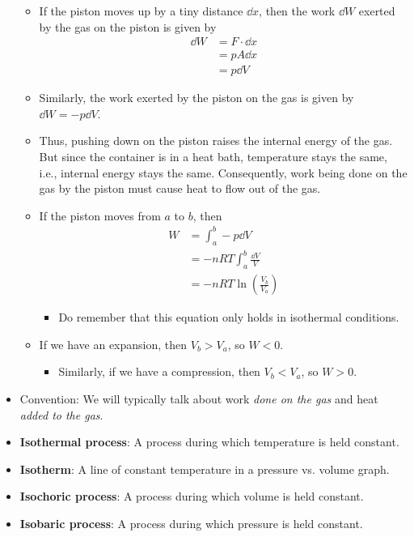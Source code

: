 \documentclass[../notes.tex]{subfiles}
\begin{document}
\begin{itemize}
\begin{itemize}
        \item If the piston moves up by a tiny distance $\dd{x}$, then the work $\dd{W}$ exerted by the gas on the piston is given by
        \begin{align*}
            \dd{W} &= F\cdot\dd{x}\\
            &= pA\dd{x}\\
            &= p\dd{V}
        \end{align*}
        \item Similarly, the work exerted by the piston on the gas is given by $\dd{W}=-p\dd{V}$.
        \item Thus, pushing down on the piston raises the internal energy of the gas. But since the container is in a heat bath, temperature stays the same, i.e., internal energy stays the same. Consequently, work being done on the gas by the piston must cause heat to flow out of the gas.
        \item If the piston moves from $a$ to $b$, then
        \begin{align*}
            W &= \int_a^b-p\dd{V}\\
            &= -nRT\int_a^b\frac{\dd{V}}{V}\\
            &= -nRT\ln\left( \frac{V_b}{V_a} \right)
        \end{align*}
        \begin{itemize}
            \item Do remember that this equation only holds in isothermal conditions.
        \end{itemize}
        \item If we have an expansion, then $V_b>V_a$, so $W<0$.
        \begin{itemize}
            \item Similarly, if we have a compression, then $V_b<V_a$, so $W>0$.
        \end{itemize}
    \end{itemize}
    \item Convention: We will typically talk about work \emph{done on the gas} and heat \emph{added to the gas}.
    \item \textbf{Isothermal process}: A process during which temperature is held constant.
    \item \textbf{Isotherm}: A line of constant temperature in a pressure vs. volume graph.
    \item \textbf{Isochoric process}: A process during which volume is held constant.
    \item \textbf{Isobaric process}: A process during which pressure is held constant.

\end{itemize}
\end{document}

